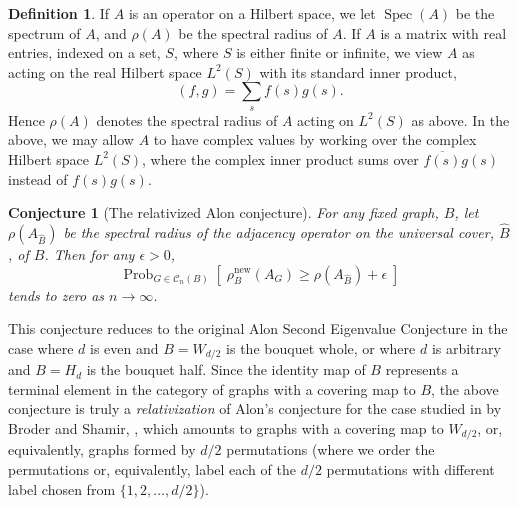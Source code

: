 \documentclass{memo-l}
\theoremstyle{plain}
\newtheorem{conjecture}[theorem]{Conjecture}
\theoremstyle{definition}
\newtheorem{definition}[theorem]{Definition}
\numberwithin{section}{chapter}
\numberwithin{equation}{chapter}
\newcommand{\prob}[2]{{\Prob}_{#1}{\left[\; #2\; \right]}}
\DeclareMathOperator{\Prob}{Prob}
\DeclareMathOperator{\Spec}{Spec}
\newcommand{\rhonew}{\rho^{\mathrm{new}}}
\theoremstyle{plain}
\theoremstyle{definition}
\newcommand\cC{\mathcal{C}}
\begin{document}
\begin{definition} If $A$ is an operator on a Hilbert space, we let
$\Spec(A)$ be the spectrum of $A$, and
$\rho(A)$ be the spectral radius of $A$.
If $A$ is a matrix with real entries, indexed on a set, $S$, where $S$ is
either finite or infinite, we view $A$ as acting on the
real Hilbert space $L^2(S)$ with its standard inner product,
$$
(f,g) = \sum_s f(s)g(s).
$$
Hence $\rho(A)$ denotes the spectral radius of $A$ acting on $L^2(S)$ as
above.
In the above, we may allow $A$ to have complex values by working over
the complex Hilbert space $L^2(S)$, where the complex inner product
sums over $\overline{f(s)}g(s)$ instead of $f(s)g(s)$.
\end{definition}

\begin{conjecture}[The relativized Alon conjecture]
\label{co:gen_Alon}
For any fixed graph, $B$, let $\rho(A_{\widehat B})$ be the spectral 
radius of the
adjacency operator on the 
universal cover,
$\widehat B$, of $B$.  
Then for any $\epsilon>0$,
$$
\prob{G\in \cC_n(B)}{\rhonew_B(A_G) \ge \rho(A_{\widehat B})+\epsilon}
$$
tends to zero as $n\to\infty$.
\end{conjecture}
This conjecture reduces to the original Alon Second Eigenvalue Conjecture
in the case where $d$ is even and 
$B=W_{d/2}$ is the 
\gls{bouquet whole},
or where $d$ is arbitrary and 
$B=H_d$ is the 
\gls{bouquet half}.
Since the identity map of $B$ represents a terminal
element in the category of graphs with a covering map to $B$,
the above conjecture is truly a
{\em relativization} of Alon's conjecture for the case studied in
by Broder and Shamir, \cite{broder}, which amounts to graphs with 
a covering map to $W_{d/2}$, or, equivalently, graphs formed by
$d/2$ permutations (where we order the permutations or, equivalently,
label each of the $d/2$ permutations with different label chosen from
$\{1,2,\ldots,d/2\}$).
\end{document}
